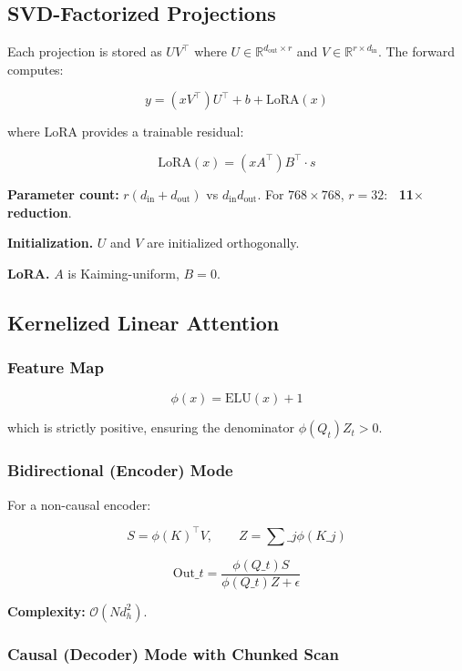 \subsection{SVD-Factorized Projections}

Each projection is stored as $U V^\top$ where $U \in \mathbb{R}^{d_\text{out} \times r}$ 
and $V \in \mathbb{R}^{r \times d_\text{in}}$. The forward computes:

\[
y = (x V^\top) U^\top + b + \text{LoRA}(x)
\tag{4.1}
\]

where LoRA provides a trainable residual:

\[
\text{LoRA}(x) = (x A^\top) B^\top \cdot s
\tag{4.2}
\]

\textbf{Parameter count:} $r(d_\text{in} + d_\text{out})$ vs $d_\text{in} d_\text{out}$. 
For $768 \times 768$, $r = 32$: \textbf{~11$\times$ reduction}.

\textbf{Initialization.} $U$ and $V$ are initialized orthogonally.

\textbf{LoRA.} $A$ is Kaiming-uniform, $B = 0$.

\subsection{Kernelized Linear Attention}

\subsubsection{Feature Map}

\[
\phi(x) = \text{ELU}(x) + 1
\tag{4.3}
\]

which is strictly positive, ensuring the denominator $\phi(Q_t) Z_t > 0$.

\subsubsection{Bidirectional (Encoder) Mode}

For a non-causal encoder:

\[
S = \phi(K)^\top V, \qquad
Z = \sum\_j \phi(K\_j)
\tag{4.4}
\]

\[
\text{Out}\_t = \frac{\phi(Q\_t) S}{\phi(Q\_t) Z + \epsilon}
\tag{4.5}
\]

\textbf{Complexity:} $\mathcal{O}(N d_h^2)$.

\subsubsection{Causal (Decoder) Mode with Chunked Scan}

